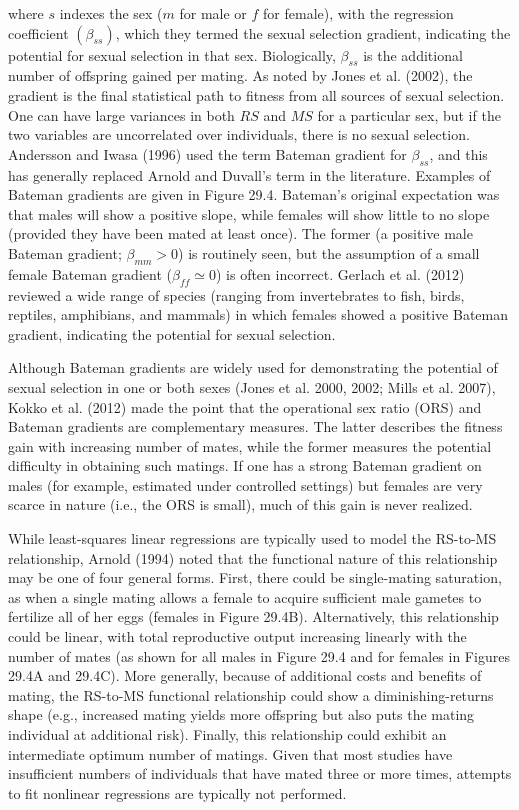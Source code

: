 \documentclass{article}
\begin{document}
where $s$ indexes the sex ($m$ for male or $f$ for female), with the regression coefficient $(\beta_{ss})$, which they termed the sexual selection gradient, indicating the potential for sexual selection in that sex. Biologically, $\beta_{ss}$ is the additional number of offspring gained per mating. As noted by Jones et al. (2002), the gradient is the final statistical path to fitness from all sources of sexual selection. One can have large variances in both $RS$ and $MS$ for a particular sex, but if the two variables are uncorrelated over individuals, there is no sexual selection. Andersson and Iwasa (1996) used the term Bateman gradient for $\beta_{ss}$, and this has generally replaced Arnold and Duvall's term in the literature. Examples of Bateman gradients are given in Figure 29.4. Bateman's original expectation was that males will show a positive slope, while females will show little to no slope (provided they have been mated at least once). The former (a positive male Bateman gradient; $\beta_{mm} > 0$) is routinely seen, but the assumption of a small female Bateman gradient ($\beta_{ff} \simeq 0$) is often incorrect. Gerlach et al. (2012) reviewed a wide range of species (ranging from invertebrates to fish, birds, reptiles, amphibians, and mammals) in which females showed a positive Bateman gradient, indicating the potential for sexual selection.

Although Bateman gradients are widely used for demonstrating the potential of sexual selection in one or both sexes (Jones et al. 2000, 2002; Mills et al. 2007), Kokko et al. (2012) made the point that the operational sex ratio (ORS) and Bateman gradients are complementary measures. The latter describes the fitness gain with increasing number of mates, while the former measures the potential difficulty in obtaining such matings. If one has a strong Bateman gradient on males (for example, estimated under controlled settings) but females are very scarce in nature (i.e., the ORS is small), much of this gain is never realized.

While least-squares linear regressions are typically used to model the RS-to-MS relationship, Arnold (1994) noted that the functional nature of this relationship may be one of four general forms. First, there could be single-mating saturation, as when a single mating allows a female to acquire sufficient male gametes to fertilize all of her eggs (females in Figure 29.4B). Alternatively, this relationship could be linear, with total reproductive output increasing linearly with the number of mates (as shown for all males in Figure 29.4 and for females in Figures 29.4A and 29.4C). More generally, because of additional costs and benefits of mating, the RS-to-MS functional relationship could show a diminishing-returns shape (e.g., increased mating yields more offspring but also puts the mating individual at additional risk). Finally, this relationship could exhibit an intermediate optimum number of matings. Given that most studies have insufficient numbers of individuals that have mated three or more times, attempts to fit nonlinear regressions are typically not performed.
\end{document}

